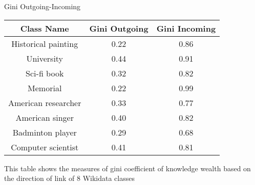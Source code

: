 \begin{center}
    \small
    \begin{threeparttable}
    \caption{Gini Outgoing-Incoming}
    \label{tab:gini outgoing-incoming}
    \begin{tabular}{c c c} 
    
    \toprule
        Class Name & Gini Outgoing & Gini Incoming \\ [0.5ex] 
    \midrule
        Historical painting & 0.22 & 0.86 \\
        University & 0.44 & 0.91 \\
        Sci-fi book & 0.32 & 0.82 \\
        Memorial & 0.22 & 0.99 \\
        American researcher & 0.33 & 0.77 \\
        American singer & 0.40 & 0.82 \\
        Badminton player & 0.29 & 0.68 \\
        Computer scientist & 0.41 & 0.81 \\
        [1ex]
    \bottomrule
    \end{tabular}
    \begin{tablenotes}
        \footnotesize
        This table shows the measures of gini coefficient of knowledge wealth based on the direction of link of 8 Wikidata classes
    \end{tablenotes}
    \end{threeparttable}
\end{center}